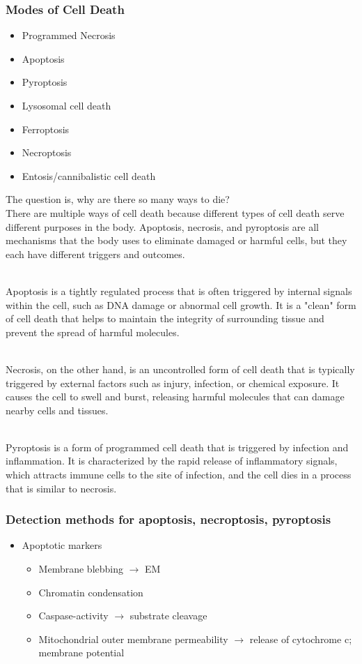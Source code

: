 \begin{itemize}
\begin{itemize}
\subsubsection{Modes of Cell Death}
\begin{itemize}
    \item Programmed Necrosis
    \item Apoptosis
    \item Pyroptosis
    \item Lysosomal cell death
    \item Ferroptosis
    \item Necroptosis
    \item Entosis/cannibalistic cell death
    \end{itemize}
The question is, why are there so many ways to die?
\\There are multiple ways of cell death because different types of cell death serve different purposes in the body. Apoptosis, necrosis, and pyroptosis are all mechanisms that the body uses to eliminate damaged or harmful cells, but they each have different triggers and outcomes.

\\Apoptosis is a tightly regulated process that is often triggered by internal signals within the cell, such as DNA damage or abnormal cell growth. It is a "clean" form of cell death that helps to maintain the integrity of surrounding tissue and prevent the spread of harmful molecules.

\\Necrosis, on the other hand, is an uncontrolled form of cell death that is typically triggered by external factors such as injury, infection, or chemical exposure. It causes the cell to swell and burst, releasing harmful molecules that can damage nearby cells and tissues.

\\Pyroptosis is a form of programmed cell death that is triggered by infection and inflammation. It is characterized by the rapid release of inflammatory signals, which attracts immune cells to the site of infection, and the cell dies in a process that is similar to necrosis.
\subsubsection{Detection methods for apoptosis, necroptosis, pyroptosis}
\begin{itemize}
    \item Apoptotic markers
    \begin{itemize}
        \item Membrane blebbing $\rightarrow$ EM
        \item Chromatin condensation
        \item Caspase-activity $\rightarrow$ substrate cleavage
\item Mitochondrial outer membrane permeability $\rightarrow$ release of cytochrome c; membrane potential
\end{itemize}


\end{itemize}
\end{itemize}
\end{itemize}
